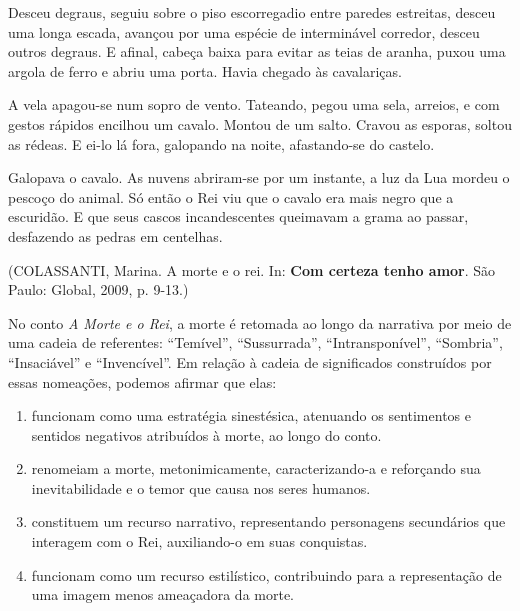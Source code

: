 Desceu degraus, seguiu sobre o piso escorregadio entre paredes estreitas, desceu uma longa escada, avançou por uma espécie de interminável corredor, desceu outros degraus. E afinal, cabeça baixa para evitar as teias de aranha, puxou uma argola de ferro e abriu uma porta. Havia chegado às cavalariças.

A vela apagou-se num sopro de vento. Tateando, pegou uma sela, arreios, e com gestos rápidos encilhou um cavalo. Montou de um salto. Cravou as esporas, soltou as rédeas. E ei-lo lá fora, galopando na noite, afastando-se do castelo.

Galopava o cavalo. As nuvens abriram-se por um instante, a luz da Lua mordeu o pescoço do animal. Só então o Rei viu que o cavalo era mais negro que a escuridão. E que seus cascos incandescentes queimavam a grama ao passar, desfazendo as pedras em centelhas.

\begin{flushright}(COLASSANTI, Marina. A morte e o rei. In: \textbf{Com certeza tenho amor}. São Paulo: Global, 2009, p. 9-13.)\end{flushright}

No conto \textit{A Morte e o Rei}, a morte é retomada ao longo da narrativa por meio de uma cadeia de referentes: “Temível”, “Sussurrada”, “Intransponível”, “Sombria”, “Insaciável” e “Invencível”. Em relação à cadeia de significados construídos por essas nomeações, podemos afirmar que elas:
\begin{enumerate}
\item funcionam como uma estratégia sinestésica, atenuando os sentimentos e sentidos negativos atribuídos à morte, ao longo do conto.
\item renomeiam a morte, metonimicamente, caracterizando-a e reforçando sua inevitabilidade e o temor que causa nos seres humanos.
\item constituem um recurso narrativo, representando personagens secundários que interagem com o Rei, auxiliando-o em suas conquistas.
\item funcionam como um recurso estilístico, contribuindo para a representação de uma imagem menos ameaçadora da morte.
\end{enumerate}
